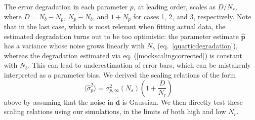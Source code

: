 \documentclass[reprint,aps,prd,superscriptaddress,showkeys,showpacs]{revtex4-1}
\newcommand{\bbh}[1]{\mathbf{\hat{#1}}}
\newcommand{\h}[1]{\hat{#1}}
\begin{document}
%
The error degradation in each parameter $p$, at leading order, scales
as $D/N_r$, where $D=N_b-N_p$, $N_p-N_b$, and $1+N_p$ for cases 1, 2,
and 3, respectively.
Note that in the last case, which is most relevant when fitting actual
data, the estimated degradation turns out to be too optimistic: the
parameter estimate $\bbh{p}$ has a variance whose noise grows linearly
with $N_b$ (eq.~\ref{quarticdegradation}), whereas the degradation
estimated via eq. (\ref{mockscalingcorrected}) is constant with
$N_b$. This can lead to underestimation of error bars, which can be
mistakenly interpreted as a parameter bias.  We derived the scaling
relations of the form
%
\begin{equation}
\label{ourscaling}
\langle\h{\sigma}_p^2\rangle = \sigma^2_{p,\infty}(N_s)\left(1+\frac{D}{N_r}\right)
\end{equation}
%
above by assuming that the noise in $\bbh{d}$ is Gaussian. We then
directly test these scaling relations using our simulations, in the
limits of both high and low $N_r$.
\end{document}
